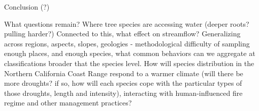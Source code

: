 Conclusion (?)

What questions remain?  Where tree species are accessing water (deeper roots?  pulling harder?) Connected to this, what effect on streamflow?  Generalizing across regions, aspects, slopes, geologies - methodological difficulty of sampling enough places, and enough species, what common behaviors can we aggregate at classifications broader that the species level.  How will species distribution in the Northern California Coast Range respond to a warmer climate (will there be more droughts? if so, how will each species cope with the particular types of those droughts, length and intensity), interacting with human-influenced fire regime and other management practices?